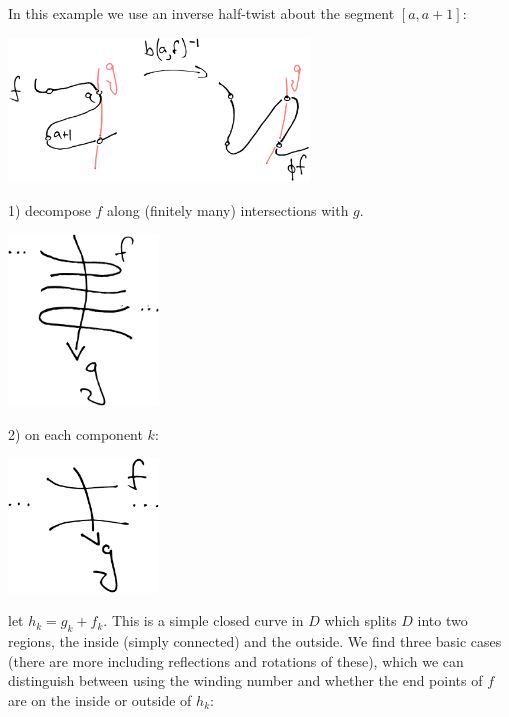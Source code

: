 \documentclass[11pt,a4paper]{article}
\begin{document}

In this example we use an inverse half-twist about the segment $[a, a+1]:$

\begin{center}
\includegraphics[width=0.6\textwidth]{example-problem-1.eps}
\end{center}



1) decompose $f$ along (finitely many) intersections
with $g.$

\begin{center}
\includegraphics[width=0.3\textwidth]{snake-decompose.eps}
\end{center}


2) on each component $k$:

\begin{center}
\includegraphics[width=0.3\textwidth]{snake-component.eps}
\end{center}

let $h_k = g_k + f_k.$
This is a simple closed curve in $D$ which splits $D$
into two regions, the inside (simply connected) and the
outside.
We find three basic cases (there are more including reflections
and rotations of these), which we can distinguish between
using the winding number and whether the end points
of $f$ are on the inside or outside of $h_k$:
\end{document}

